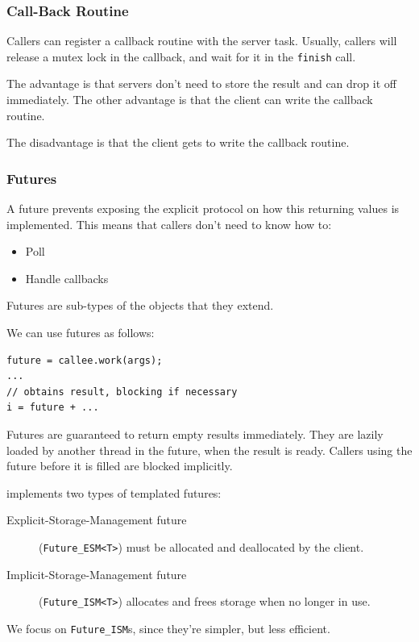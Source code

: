                 \subsubsection{Call-Back Routine} %
                \label{ssub:call_back_routine}
                    Callers can register a callback routine with the server task.
                    Usually, callers will release a mutex lock in the callback, and wait for it in the \verb|finish| call.

                    The advantage is that servers don't need to store the result and can drop it off immediately.
                    The other advantage is that the client can write the callback routine.

                    The disadvantage is that the client gets to write the callback routine.
                \subsubsection{Futures} %
                \label{ssub:futures}
                    A future prevents exposing the explicit protocol on how this returning values is implemented.
                    This means that callers don't need to know how to:
                    \begin{itemize}
                        \item Poll
                        \item Handle callbacks
                    \end{itemize}
                    Futures are sub-types of the objects that they extend.

                    We can use futures as follows:
                    \begin{lstlisting}
future = callee.work(args);
...
// obtains result, blocking if necessary
i = future + ...
                    \end{lstlisting}
                    Futures are guaranteed to return empty results immediately.
                    They are lazily loaded by another thread in the future, when the result is ready.
                    Callers using the future before it is filled are blocked implicitly.

                    \uC implements two types of templated futures:
                    \begin{description}
                        \item[Explicit-Storage-Management future] (\verb|Future_ESM<T>|) must be allocated and deallocated by the client.
                        \item[Implicit-Storage-Management future] (\verb|Future_ISM<T>|) allocates and frees storage when no longer in use.
                    \end{description}
                    We focus on \verb|Future_ISM|s, since they're simpler, but less efficient.
